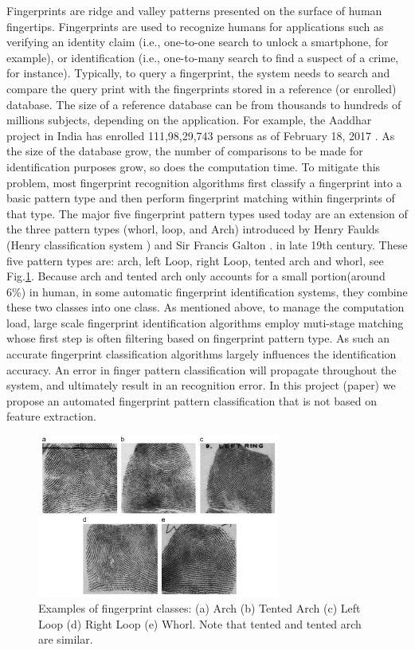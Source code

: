 

Fingerprints are ridge and valley patterns presented on the surface of human fingertips.
%
Fingerprints are used to recognize humans for applications such as verifying an identity claim (i.e., one-to-one search to  unlock a smartphone, for example), or identification (i.e., one-to-many search to find a suspect of a crime, for instance).
%
Typically, to query a fingerprint, the system needs to search and compare the query print with the fingerprints stored in a reference (or enrolled) database.  The size of a reference database can be from thousands to hundreds of millions subjects, depending on the application. For example, the Aaddhar project in India has enrolled 111,98,29,743 persons as of February 18, 2017 \cite{aaddhar}. 
%
As the size of the database grow, the number of comparisons to be made for identification purposes grow, so does the computation time.
%
To mitigate this problem, most fingerprint recognition algorithms first classify a fingerprint into a basic pattern type and then perform fingerprint matching within fingerprints of that type.
%
The major five fingerprint pattern types used today are an extension of the three pattern types (whorl, loop, and Arch) introduced by Henry Faulds (Henry classification system \cite{henry1905classification}) and Sir Francis Galton \cite{galton1892}. in late 19th century. These five pattern types are: arch, left Loop, right Loop, tented arch and whorl, see Fig.\ref{fig.fingerprint_classes}.  
%
Because arch and tented arch only accounts for a small portion(around 6\%) in human, in some automatic fingerprint identification systems, they combine these two classes into one class. 
%
As mentioned above, to manage the computation load, large scale fingerprint identification algorithms employ muti-stage matching whose first step is often filtering based on fingerprint pattern type. As such an accurate fingerprint classification algorithms largely influences the identification accuracy. An error in finger pattern classification will propagate throughout the system, and ultimately result in an recognition error. In this project (paper) we propose an automated fingerprint pattern classification that is not based on feature extraction.

\begin{figure}[!ht]
	\begin{center}
		\includegraphics[width=8cm]{fig/Fingerprint_classes.png}
	\end{center}
	\caption{Examples of fingerprint classes: (a) Arch (b) Tented Arch (c) Left Loop (d) Right Loop  (e) Whorl. Note  that tented and tented arch are similar. \cite{cao2013fingerprint}} 
	\label{fig.fingerprint_classes}
\end{figure}

